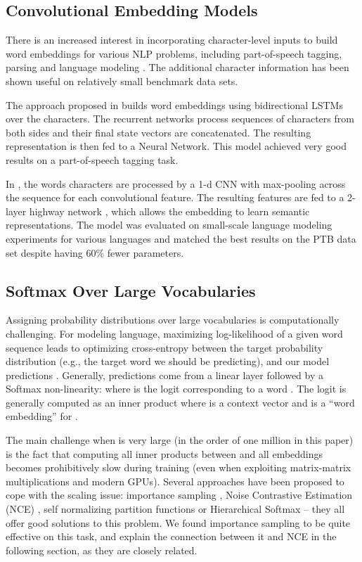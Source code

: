 \documentclass{article}
\begin{document}
\subsection{Convolutional Embedding Models}
\label{input_cnn}

There is an increased interest in incorporating character-level inputs to build word embeddings for various NLP problems, including part-of-speech tagging, parsing and language modeling \cite{ling2015finding, kim2015character, ballesteros2015improved}. The additional character information has been shown useful on relatively small benchmark data sets.

The approach proposed in \cite{ling2015finding} builds word embeddings using bidirectional LSTMs \cite{schuster1997brnn,graves2005framewise} over the characters. The recurrent networks process sequences of characters from both sides and their final state vectors are concatenated. The resulting representation is then fed to a Neural Network. This model achieved very good results on a part-of-speech tagging task.

In \cite{kim2015character}, the words characters are processed by a 1-d CNN \cite{le1990handwritten} with max-pooling across the sequence for each convolutional feature. The resulting features are fed to a 2-layer highway network \cite{srivastava2015training}, which allows the embedding to learn semantic representations. The model was evaluated on small-scale language modeling experiments for various languages and matched the best results on the PTB data set despite having 60\% fewer parameters.

\subsection{Softmax Over Large Vocabularies}
\label{large_soft}

Assigning probability distributions over large vocabularies is computationally challenging. For modeling language, maximizing log-likelihood of a given word sequence leads to optimizing cross-entropy between the target probability distribution (e.g., the target word we should be predicting), and our model predictions . Generally, predictions come from a linear layer followed by a Softmax non-linearity:  where  is the logit corresponding to a word . The logit is generally computed as an inner product  where  is a context vector and  is a ``word embedding'' for .

The main challenge when  is very large (in the order of one million in this paper) is the fact that computing all inner products between  and all embeddings becomes prohibitively slow during training (even when exploiting matrix-matrix multiplications and modern GPUs). Several approaches have been proposed to cope with the scaling issue: importance sampling \cite{bengio2003quick, bengio2008adaptive}, Noise Contrastive Estimation (NCE) \cite{gutmann2010noise, mnih2013learning}, self normalizing partition functions \cite{vincent2015efficient} or Hierarchical Softmax \cite{morin2005hierarchical, mnih2009scalable} -- they all offer good solutions to this problem. We found importance sampling to be quite effective on this task, and explain the connection between it and NCE in the following section, as they are closely related.
\end{document}
